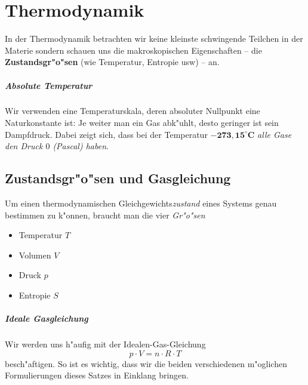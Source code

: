 \chapter{Thermodynamik}
\label{kap_thermodynamik}


In der Thermodynamik betrachten wir keine kleinste schwingende
Teilchen in der Materie sondern schauen uns die makroskopischen
Eigenschaften -- die \textbf{Zustandsgr"o"sen} (wie Temperatur, Entropie
usw) -- an. 

\paragraph{Absolute Temperatur}
\label{kap_absolute-temperatur}

Wir verwenden eine Temperaturskala, deren absoluter Nullpunkt eine
Naturkonstante ist: Je weiter man ein Gas abk"uhlt, desto geringer ist
sein Dampfdruck. Dabei zeigt sich, dass bei der Temperatur
$\mathbf{-273,15^\circ C}$ \emph{alle Gase den Druck $0$ (Pascal)
haben}.






\section{Zustandsgr"o"sen und Gasgleichung}
\label{kap_zustandsgroessen-und-gasgleichung}


\begin{Def}
    Um einen thermodynamischen
   Gleichgewichts\emph{zustand} eines Systems genau bestimmen zu k"onnen,
   braucht man die vier \emph{Gr"o"sen}
   \begin{itemize}
   \item Temperatur $T$
   \item Volumen $V$
   \item Druck $p$
   \item Entropie $S$
   \end{itemize}
\end{Def}



\paragraph{Ideale Gasgleichung}
\label{kap_ideale-gasgleichung_einfuehrung}

Wir werden uns h"aufig mit der
Idealen-Gas-Gleichung
$$
\boxed { p \cdot V = n \cdot R \cdot T }
$$
besch"aftigen. So ist es wichtig, dass wir die beiden verschiedenen
m"oglichen Formulierungen dieses Satzes in Einklang bringen.

